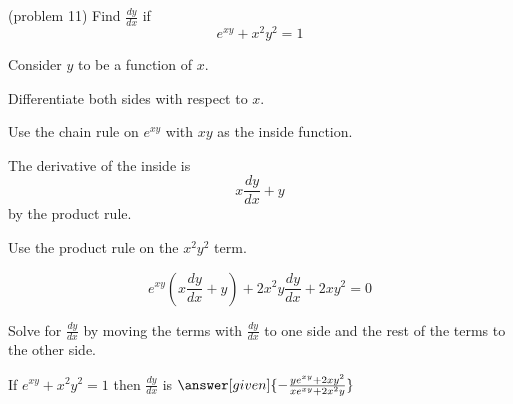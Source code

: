 \documentclass{ximera}
\begin{document}
\begin{problem} (problem 11)
  Find $\frac{dy}{dx}$ if
  \[
  e^{xy} + x^2y^2 = 1
  \]
  
	  
    \begin{hint}
      Consider $y$ to be a function of $x$.
    \end{hint}
		\begin{hint}
		  Differentiate both sides with respect to $x$.
		\end{hint}
    \begin{hint}
      Use the chain rule on $e^{xy}$ with $xy$ as the inside function.
    \end{hint}
    \begin{hint}
      The derivative of the inside is 
      \[
      x\frac{dy}{dx} + y
      \]
			by the product rule.
    \end{hint}
		\begin{hint}
      Use the product rule on the $x^2y^2$ term.
    \end{hint}
		\begin{hint}
		  \[
			e^{xy} \left( x\frac{dy}{dx} + y\right) + 2x^2y \frac{dy}{dx} + 2xy^2 = 0
			\]
		\end{hint}
		\begin{hint}
		  Solve for $\frac{dy}{dx}$ by moving the terms with $\frac{dy}{dx}$ to one side and the 
			rest of the terms to the other side.
		\end{hint}
    
		If $e^{xy} + x^2y^2 = 1$ then $\frac{dy}{dx}$ is
		 $\answer[given]{-\frac{ye^{xy} +2xy^2}{xe^{xy} + 2x^2y}}$
		
\end{problem}




\begin{center}
\begin{foldable}
\end{foldable}
\end{center}
\end{document}
